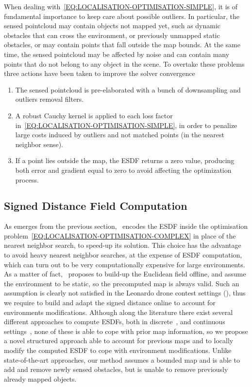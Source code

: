 \begin{remark}
    When dealing with~\eqref{EQ:LOCALISATION-OPTIMISATION-SIMPLE}, it is of fundamental importance to keep care about possible outliers.
    In particular, the sensed pointcloud may contain objects not mapped yet, such as dynamic obstacles that can cross the environment, or
    previously unmapped static obstacles, or may contain points that fall outside the map bounds.
    At the same time, the sensed pointcloud may be affected by noise and can contain many points that do not belong to any object in the scene.
    To overtake these problems three actions have been taken to improve the solver convergence
    \begin{enumerate}
        \item The sensed pointcloud is pre-elaborated with a bunch of downsampling and outliers removal filters.
        \item A robust Cauchy kernel is applied to each loss factor in~\eqref{EQ:LOCALISATION-OPTIMISATION-SIMPLE}, in order to penalize large costs
              induced by outliers and not matched points (in the nearest neighbor sense).
        \item If a point lies outside the map, the ESDF returns a zero value, producing both error and gradient equal to zero to avoid affecting the optimization process.
    \end{enumerate}
\end{remark}

\subsection{Signed Distance Field Computation}
As emerges from the previous section,~\cite{caballero2021dll} encodes the ESDF inside the optimisation problem~\eqref{EQ:LOCALISATION-OPTIMISATION-COMPLEX}
in place of the nearest neighbor search, to speed-up its solution.
This choice has the advantage to avoid heavy nearest neighbor searches, at the expense of ESDF computation, which can turn out to be
very computationally expensive for large environments. As a matter of fact,~\cite{caballero2021dll} proposes to build-up the Euclidean field
offline, and assume the environment to be static, so the precomputed map is always valid.
Such an assumption is clearly not satisfied in the Leonardo drone contest settings (), thus we require to build and
adapt the signed distance online to account for environments modifications.
Although along the literature there exist several different approaches to compute ESDFs, both in
discrete~\cite{oleynikova2017voxblox, han2019fiesta}, and continuous settings~\cite{popovic2017multiresolution, stork2020ensemble, wu2021faithful},
none of these is able to cope with prior map information, so we propose a novel structured approach able to account for previous maps
and to locally modify the computed ESDF to cope with environment modifications.
Unlike state-of-the-art approaches, our method assumes a bounded map and is able to add and remove newly sensed obstacles, but is unable
to remove previously already mapped objects.


